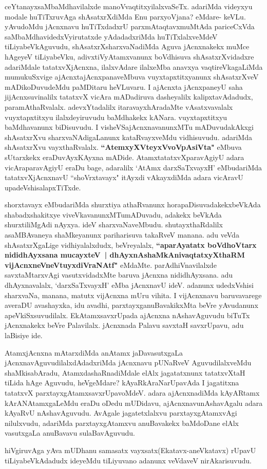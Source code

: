 \begin{artha}
ceYtanayxsaMbaMdhavilalxde manoVvaqtitxyilalxvaSeTx. adariMda videyxyu
modale huTiTxruvAga shAsatxrXdiMda Enu parxyoVjana? eMdare-
keVLu. yAvudoMdu jAcnxnavu huTiTxdadxrU parxmAtaqtavxmuMtAda
pariceCxVda saMbaMdhavidedxVyirutatxde  yAdadadxriMda huTiTxlalxveMdeV
tiLiyabeVkAguvudu, shAsatxrXsharxvaNadiMda Aguva  jAcnxnakekx muMce
hAgeyeV tiLiyabeVku, adivxtiVyAtamxvanunx boVdhisuva shAsatxrXvidadxre
adariMdale tatatxvXjAcnxna, ilalxvAdare ilalxeMba anavxya
vaqtireVkagaLiMda mumukuSxvige ajAcnxtajAcnxpanaveMbuva
vuyxtapxtitxyanunx shAsatxrXveV mADikoDuvudeMdu paMDitaru heVLuvaru. I
ajAcnxta jAcnxpaneyU saha jijAcnxsuvinalilx tatatxvX vicAra mADadiruva
dasheyalilx kalipxtavAdadudx, paramAthaRvalalx. adevxYtadalilx
itaravayxhAradaMte vAsatxvavalalx vuyxtapxtitxyu ilalxdeyiruvudu
baMdhakekx kANara. vuyxtapxtitxyu baMdhavanunx biDisuvudu. I
visheVSajAcnxnavanunxMTu mADuvudakAkxgi shAsatxrXvu
sharxvaNAdigaLanunx kataRvayxveMdu vidhisuvudu. adariMda shAsatxrXvu vayxthaRvalalx.  
\newpage
\textbf{``AtemxyXVteyxVvoVpAsiVta"} eMbuva sUtarxkekx eraDuvAyxKAyxna
mADide. AtamxtatatxvXparavAgiyU adara vicAraparavAgiyU eraDu bage,
adaralilx `AtAmx darxSaTxvayxH' eMbudariMda tatatxvXjAcnxnavU ``shoVrxtavayx" itAyxdi
vAkayxdiMda adara vicAravU upadeVshisalapxTiTxde.

shorxtavayx eMbudariMda shurxtiya athaRvanunx
horapaDisuvadakekxbeVkAda shabadxshakitxye viveVkavanunxMTumADuvadu,
adakekx beVkAda shurxtiliMgAdi nAyxya. ideV
sharxvaNaveMbudu. shutayxthaRdalilx asaMBAvaneya shaMkeyanunx
pariharisuva takaRveV manana. adu veVda shAsatxrXgaLige
vidhiyalalxdudx, beVreyalalx, \textbf{``aparAyatatx boVdhoV\s \-tarx
nididhAyxsana mucayxteV~| dhAyxnAshaMkAnivaqtatxyXthaRM
vijAcnxneVneVtuyxdiVraNAtf"} eMdaMte. parAdhiVnavilalxde savxtaMtarxvAgi
vasutxvidadxMte baruva jAcnxna nididhAyxsana. adu dhAyxnavalalx,
`darxSaTxvayxH' eMba jAcnxnavU ideV. adanunx udedxVshisi sharxvaNa, manana,
matutx vijAcnxna mUru vihita. I vijAcnxnavu baruvavarege averaDU
avashayxka, idu avadhi, parxtayxganuBavakikxMta beVre yAvudanunx
apeVkiSxsuvudilalx. EkAtamxsavxrUpada ajAcnxna nAshavAguvudu biTuTx
jAcnxnakekx beVre Palavilalx. jAcnxnada Palavu savxtaH
savxrUpavu, adu laBisiye ide.
\end{artha}

\begin{artha}
AtamxjAcnxna mAtarxdiMda anAtamx jaDavasutxgaLa
jAcnxnavAguvudilalxdAdadxriMda  jAcnxnavu pUNaRveV AguvudilalxveMdu
shaMkisabAradu, AtamxdashaRnadiMdale elAlx jagatatxnunx tatatxvXtaH
tiLida hAge Aguvudu, heVgeMdare? kAyaRkAraNarUpavAda I jagatitxna
tatatxvX parxtayxgAtamxsavxrUpavoMdeV. adara ajAcnxnadiMda kAyARtamx
kArANAtamxgaLeMdu eraDu oDedu mUDidavu, ajAcnxnavunAshavAgalu
adara kAyaRvU nAshavAguvudu. AvAgale jagatetxlalxvu parxtayxgAtamxvAgi
nilulxvudu, adariMda parxtayxgAtamxvu anuBavakekx baMdoDane elAlx
vasutxgaLa anuBavavu sulaBavAguvudu.

hiVgiruvAga yAva mUDhanu samasatx vayxsatx(Ekatavx-aneVkatavx) rUpavU
tiLiyabeVkAdadudx ideyeMdu tiLiyuvano adanunx veVdaveV nirAkarisuvudu.
\end{artha}

